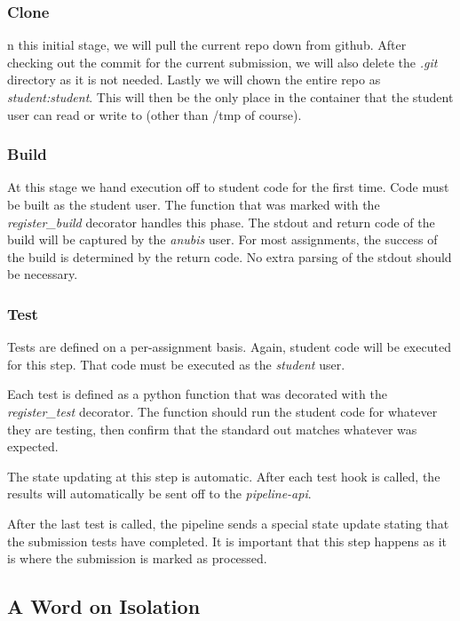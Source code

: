 \subsubsection{Clone}

n this initial stage, we will pull the current repo down from github.
After checking out the commit for the current submission, we will also delete
the \textit{.git} directory as it is not needed.
Lastly we will chown the entire repo as \textit{student:student}.
This will then be the only place in the container that the student user
can read or write to (other than /tmp of course).

\subsubsection{Build}

At this stage we hand execution off to student code for the first time.
Code must be built as the student user.
The function that was marked with the \textit{register\_build} decorator handles this phase.
The stdout and return code of the build will be captured by the \textit{anubis} user.
For most assignments, the success of the build is determined by the return code.
No extra parsing of the stdout should be necessary.

\subsubsection{Test}

Tests are defined on a per-assignment basis.
Again, student code will be executed for this step.
That code must be executed as the \textit{student} user.

Each test is defined as a python function that was decorated with the
\textit{register\_test} decorator.
The function should run the student code for whatever they are testing, then
confirm that the standard out matches whatever was expected.

The state updating at this step is automatic.
After each test hook is called, the results will automatically be sent off to the
\textit{pipeline-api}.

After the last test is called, the pipeline sends a special state update stating that
the submission tests have completed.
It is important that this step happens as it is where the submission is marked as
processed.

\subsection{A Word on Isolation}\label{subsec:a-word-on-isolation}





